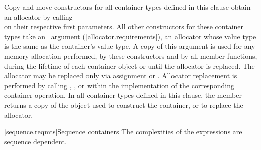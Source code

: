 \documentclass[american,twoside]{book}
\begin{document}
\setcounter{Paras}{8}
\pnum
Copy and move constructors for all container types defined in this
clause  obtain an allocator by calling\\
on their respective first parameters. All other constructors for these
container types take an \ argument
(\ref{allocator.requirements}), an allocator whose value type is the
same as the container's value type. A copy of this argument is used
for any memory allocation performed, by these constructors and by all
member functions, during the lifetime of each container object or
until the allocator is replaced. The allocator may be replaced only
via assignment or . Allocator replacement is performed
by calling
,
, or
within the implementation of the corresponding container operation. In
all container types defined in this clause, the member
 returns a copy of the  object
used to construct the container, or to replace the allocator. 

[sequence.reqmts]{Sequence containers}
\setcounter{Paras}{3}
\pnum
The complexities of the expressions are sequence dependent.

\setcounter{table}{91}
\end{document}
